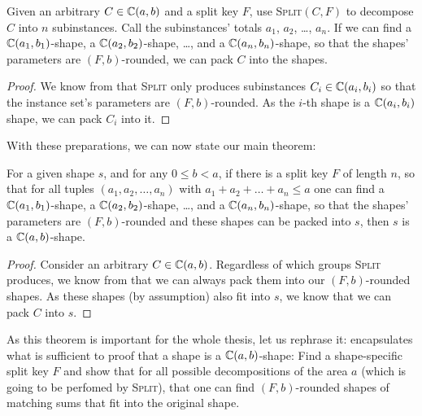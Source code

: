 \documentclass[%
    a4paper,              %
    style=screen,          %
    bibliography=totoc,   %
    nexus,                %
    lnum,                 %
    extramargin,          %
]{tubsbook}
\begin{document}

\begin{lemma}\label{th:split-rounded}
    Given an arbitrary $C \in \mathbb{C}(a,b)$ and a split key $F$, use \textsc{Split}$(C,F)$ to decompose $C$ into $n$ subinstances. Call the subinstances' totals $a_1$, $a_2$, \dots, $a_n$. If we can find a $\mathbb{C}(a_1, b_1)$-shape, a $\mathbb{C}(a_2, b_2)$-shape, \dots, and a $\mathbb{C}(a_n, b_n)$-shape, so that the shapes' parameters are $(F,b)$-rounded, we can pack $C$ into the shapes.
\end{lemma}

\begin{proof}
    We know from  that \textsc{Split} only produces subinstances $C_i \in \mathbb{C}(a_i, b_i)$ so that the instance set's parameters are $(F,b)$-rounded. As the $i$-th shape is a $\mathbb{C}(a_i, b_i)$ shape, we can pack $C_i$ into it.
\end{proof}

With these preparations, we can now state our main theorem:

\begin{theorem}\label{th:splitpack}
    For a given shape $s$, and for any $0 \le b < a$, if there is a split key $F$ of length $n$, so that for all tuples $(a_1, a_2, \dots, a_n)$ with $a_1 + a_2 + \dots + a_n \le a$
    one can find a $\mathbb{C}(a_1, b_1)$-shape, a $\mathbb{C}(a_2, b_2)$-shape, \dots, and a $\mathbb{C}(a_n, b_n)$-shape, so that the shapes' parameters are $(F,b)$-rounded
    and these shapes can be packed into $s$, then $s$ is a $\mathbb{C}(a,b)$-shape.
\end{theorem}

\begin{proof}
    Consider an arbitrary $C \in \mathbb{C}(a,b)$. Regardless of which groups \textsc{Split} produces, we know from  that we can always pack them into our $(F,b)$-rounded shapes. As these shapes (by assumption) also fit into $s$, we know that we can pack $C$ into $s$.
\end{proof}

As this theorem is important for the whole thesis, let us rephrase it:  encapsulates what is sufficient to proof that a shape is a $\mathbb{C}(a,b)$-shape: Find a shape-specific split key $F$ and show that for all possible decompositions of the area $a$ (which is going to be perfomed by \textsc{Split}), that one can find $(F,b)$-rounded shapes of matching sums that fit into the original shape.
\end{document}
